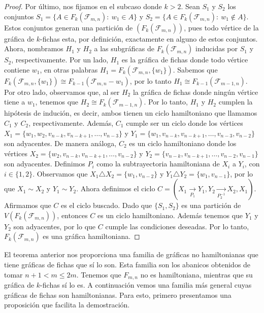 \begin{proof}
    Por \'ultimo, nos fijamos en el subcaso donde $k>2$. Sean $S_1$ y $S_2$ los
    conjuntos $S_1=\{A \in F_k(\mathcal{F}_{m,n}) \colon\ w_1 \in A\}$ y
    $S_2=\{A \in F_k(\mathcal{F}_{m,n}) \colon\ w_1 \notin A\}$. Estos conjuntos
    generan una partici\'on de $(F_k(\mathcal{F}_{m,n}))$, pues todo v\'ertice
    de la gr\'afica de $k$-fichas esta, por definici\'on, exactamente en alguno
    de estos conjuntos. Ahora, nombramos $H_1$ y $H_2$ a las subgr\'aficas de
    $F_k(\mathcal{F}_{m,n})$ inducidas por $S_1$ y $S_2$, respectivamente. Por
    un lado, $H_1$ es la gr\'afica de fichas donde todo v\'ertice contiene
    $w_1$, en otras palabras $H_1= F_k(\mathcal{F}_{m,n},\{w_1\})$. Sabemos que
    $F_k(\mathcal{F}_{m,n},\{w_1\}) \cong F_{k-1}(\mathcal{F}_{m,n}- w_1)$, por
    lo tanto $H_1 \cong F_{k-1}(\mathcal{F}_{m-1,n})$. Por otro lado, observamos
    que, al ser $H_2$ la gr\'afica de fichas donde ning\'un v\'ertice tiene a
    $w_1$, tenemos que $H_2 \cong F_k(\mathcal{F}_{m-1,n})$. Por lo tanto, $H_1$
    y $H_2$ cumplen la hip\'otesis de induci\'on, es decir, ambos tienen un
    ciclo hamiltoniano que llamamos $C_1$ y $C_2$, respectivamente. Adem\'as,
    $C_1$ cumple ser un ciclo donde los v\'ertices $X_1 = \{w_1,
    w_2,v_{n-k},v_{n-k+1}, \dots, v_{n-3}\}$ y $Y_1 = \{w_1,v_{n-k},v_{n-k+1},
    \dots, v_{n-3},v_{n-2}\}$ son adyacentes. De manera an\'aloga, $C_2$ es un
    ciclo hamiltoniano donde los v\'ertices $X_2 = \{ w_2,v_{n-k},v_{n-k+1},
    \dots, v_{n-2}\}$ y $Y_2 = \{v_{n-k},v_{n-k+1}, \dots, v_{n-2},v_{n-1}\}$
    son adyacentes. Definimos $P_i$ como la subtrayectoria hamiltoniana de $X_i$
    a $Y_i$, con $i \in \{ 1,2 \}$. Observamos que $X_1 \triangle X_2 =
    \{w_1,v_{n-2}\}$ y $Y_1 \triangle Y_2 = \{w_1, v_{n-1}\}$, por lo que $X_1
    \sim X_2$ y $Y_1 \sim Y_2$. Ahora definimos el ciclo $C = (X_1
    \xrightarrow[P_1]{}Y_1,Y_2 \xrightarrow[P_2^{-1}]{}X_2,X_1)$. Afirmamos que
    $C$ es el ciclo buscado. Dado que $\{S_1,S_2\}$ es una partici\'on de
    $V(F_k(\mathcal{F}_{m,n}))$, entonces $C$ es un ciclo hamiltoniano. Adem\'as
    tenemos que $Y_1$ y $Y_2$ son adyacentes, por lo que $C$ cumple las
    condiciones deseadas. Por lo tanto, $F_k(\mathcal{F}_{m,n})$ es una gr\'afica
    hamiltoniana.
\end{proof}

El teorema anterior nos proporciona una familia de gr\'aficas no hamiltonianas
que tiene gr\'aficas de fichas que s\'i lo son. Esta familia son los abanicos
obtenidos de tomar $n+1 < m \leq 2m$. Tenemos que $F_{m,n}$ no es hamiltoniana,
mientras que su gr\'afica de $k$-fichas s\'i lo es. A continuaci\'on vemos una
familia m\'as general cuyas gr\'aficas de fichas son hamiltonianas. Para esto,
primero presentamos una proposici\'on que facilita la demostraci\'on.

